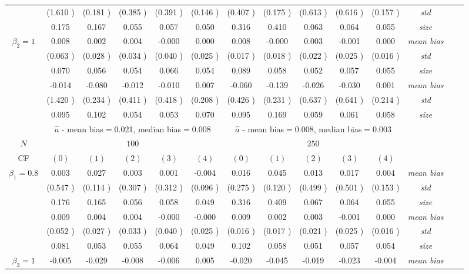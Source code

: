 \begin{table}
\begin{threeparttable}
{\begin{tabular}{|c|c|c|c|c|c|c|c|c|c|c|c|c|c|}
&(1.610 )&(0.181 )&(0.385 )&(0.391 )&(0.146 )&(0.407 )&(0.175 )&(0.613 )&(0.616 )&(0.157 )&\textit{std}\\ 
& 0.175 & 0.167 &0.055 &0.057 &0.050 &0.316& 0.410 &0.063 &0.064& 0.055 &\textit{size} \\ \midrule 
\multirow{4}{*}{$\beta_2=1$}& 0.008 & 0.002 &0.004 &-0.000 &0.000 &0.008& -0.000 &0.003 &-0.001& 0.000 &\textit{mean bias} \\ 
&(0.063 )&(0.028 )&(0.034 )&(0.040 )&(0.025 )&(0.017 )&(0.018 )&(0.022 )&(0.025 )&(0.016 )&\textit{std}\\ 
& 0.070 & 0.056 &0.054 &0.066 &0.054 &0.089& 0.058 &0.052& 0.057 &0.055 &\textit{size} \\\midrule 
\multirow{4}{*}{$\beta_3=1$}& -0.014 & -0.080 &-0.012& -0.010 &0.007 &-0.060 &-0.139 &-0.026 &-0.030& 0.001 &\textit{mean bias} \\ 
&(1.420 )&(0.234 )&(0.411 )&(0.418 )&(0.208 )&(0.426 )&(0.231 )&(0.637 )&(0.641 )&(0.214 )&\textit{std}\\ 
& 0.095 & 0.102 &0.054 &0.053 &0.070 &0.095& 0.169& 0.059 &0.061 &0.058 &\textit{size} \\\midrule 
&\multicolumn{5}{|c|}{$\hat{a}$ - mean bias$=$0.021, median bias$=$0.008 }&\multicolumn{5}{|c|}{$\hat{a}$ - mean bias$=$0.008, median bias$=$0.003 }&\\ \hline 
\cellcolor{yellow}$N$&\multicolumn{5}{|c|}{\cellcolor{yellow}$100$}&\multicolumn{5}{|c|}{\cellcolor{yellow}$250$}&\\\hline 
CF&$(0)$&$(1)$&$(2)$&$(3)$&$(4)$& $(0)$ &$(1)$&$(2)$&$(3)$&$(4)$&\\\hline 
\multirow{4}{*}{$\beta_1=0.8$}& 0.003 & 0.027 &0.003 &0.001 &-0.004 &0.016& 0.045 &0.013 &0.017& 0.004 &\textit{mean bias} \\ 
&(0.547 )&(0.114 )&(0.307 )&(0.312 )&(0.096 )&(0.275 )&(0.120 )&(0.499 )&(0.501 )&(0.153 )&\textit{std}\\ 
& 0.176 & 0.165 &0.056 &0.058 &0.049 &0.316& 0.409 &0.067 &0.064& 0.055 &\textit{size} \\\midrule 
\multirow{4}{*}{$\beta_2=1$}& 0.009 & 0.004 &0.004 &-0.000 &-0.000 &0.009& 0.002 &0.003 &-0.001& 0.000 &\textit{mean bias} \\ 
&(0.052 )&(0.027 )&(0.033 )&(0.040 )&(0.025 )&(0.016 )&(0.017 )&(0.021 )&(0.025 )&(0.016 )&\textit{std}\\ 
& 0.081 & 0.053 &0.055 &0.064 &0.049 &0.102& 0.058 &0.051& 0.057 &0.054 &\textit{size} \\ \midrule
\multirow{4}{*}{$\beta_3=1$}& -0.005 & -0.029 &-0.008& -0.006 &0.005 &-0.020 &-0.045 &-0.019 &-0.023& -0.004 &\textit{mean bias} \\ 

\end{tabular}}
\end{threeparttable}
\end{table}
